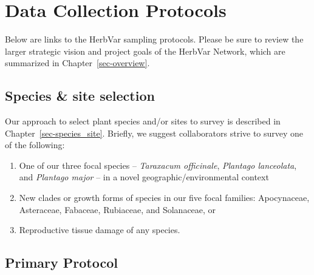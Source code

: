 \documentclass[
  letterpaper,
  oneside,
  open=any]{scrbook}
\providecommand{\tightlist}{%
  \setlength{\itemsep}{0pt}\setlength{\parskip}{0pt}}\usepackage{longtable,booktabs,array}
\begin{document}
\chapter{Data Collection Protocols}\label{sec-data-collection}

\begin{tcolorbox}[enhanced jigsaw, rightrule=.15mm, title=\textcolor{quarto-callout-important-color}{\faExclamation}\hspace{0.5em}{Important}, colbacktitle=quarto-callout-important-color!10!white, coltitle=black, bottomtitle=1mm, breakable, colback=white, leftrule=.75mm, arc=.35mm, toprule=.15mm, colframe=quarto-callout-important-color-frame, opacityback=0, left=2mm, toptitle=1mm, titlerule=0mm, bottomrule=.15mm, opacitybacktitle=0.6]

Below are links to the HerbVar sampling protocols. Please be sure to
review the larger strategic vision and project goals of the HerbVar
Network, which are summarized in Chapter~\ref{sec-overview}.

\end{tcolorbox}

\section{Species \& site selection}\label{species-site-selection}

Our approach to select plant species and/or sites to survey is described
in Chapter~\ref{sec-species_site}. Briefly, we suggest collaborators
strive to survey one of the following:

\begin{enumerate}
\def\labelenumi{(\arabic{enumi})}
\tightlist
\item
  One of our three focal species -- \emph{Taraxacum officinale},
  \emph{Plantago lanceolata}, and \emph{Plantago major} -- in a novel
  geographic/environmental context\\
\item
  New clades or growth forms of species in our five focal families:
  Apocynaceae, Asteraceae, Fabaceae, Rubiaceae, and Solanaceae, or\\
\item
  Reproductive tissue damage of any species.
\end{enumerate}

\section{Primary Protocol}\label{primary-protocol}
\end{document}
